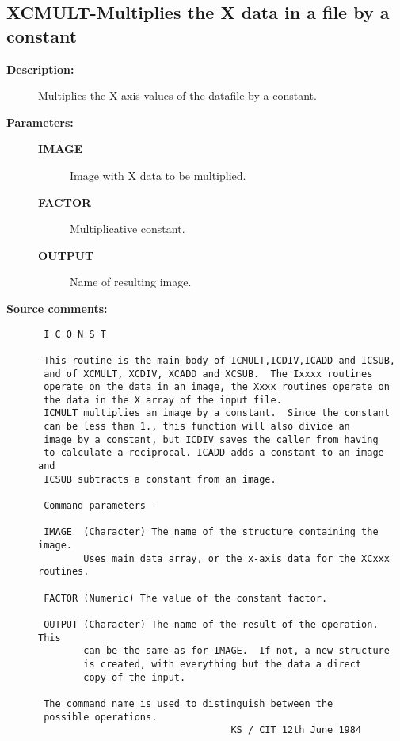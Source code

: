 \subsection{XCMULT-\label{XCMULT}Multiplies the X data in a file by a constant}
\begin{description}

\item [{\bf Description:}]
 Multiplies the X-axis values of the datafile by a constant.

\item [{\bf Parameters:}]
\begin{description}
\item [{\bf IMAGE}]
 Image with X data to be multiplied.
\item [{\bf FACTOR}]
 Multiplicative constant.
\item [{\bf OUTPUT}]
 Name of resulting image.
\end{description}

\item [{\bf Source comments:}]
\begin{verbatim}
 I C O N S T

 This routine is the main body of ICMULT,ICDIV,ICADD and ICSUB,
 and of XCMULT, XCDIV, XCADD and XCSUB.  The Ixxxx routines
 operate on the data in an image, the Xxxx routines operate on
 the data in the X array of the input file.
 ICMULT multiplies an image by a constant.  Since the constant
 can be less than 1., this function will also divide an
 image by a constant, but ICDIV saves the caller from having
 to calculate a reciprocal. ICADD adds a constant to an image and
 ICSUB subtracts a constant from an image.

 Command parameters -

 IMAGE  (Character) The name of the structure containing the image.
        Uses main data array, or the x-axis data for the XCxxx routines.

 FACTOR (Numeric) The value of the constant factor.

 OUTPUT (Character) The name of the result of the operation.  This
        can be the same as for IMAGE.  If not, a new structure
        is created, with everything but the data a direct
        copy of the input.

 The command name is used to distinguish between the
 possible operations.
                                  KS / CIT 12th June 1984
\end{verbatim}
\end{description}

